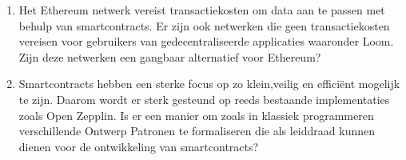 \begin{enumerate}
\item Het Ethereum netwerk vereist transactiekosten om data aan te passen met behulp van smartcontracts. Er zijn ook netwerken die geen transactiekosten vereisen voor gebruikers van gedecentraliseerde applicaties waaronder Loom. Zijn deze netwerken een gangbaar alternatief voor Ethereum?
\item Smartcontracts hebben een sterke focus op zo klein,veilig en efficiënt mogelijk te zijn. Daarom wordt er sterk gesteund op reeds bestaande implementaties zoals Open Zepplin. Is er een manier om zoals in klassiek programmeren verschillende Ontwerp Patronen te formaliseren die als leiddraad kunnen dienen voor de ontwikkeling van smartcontracts?
\end{enumerate}

